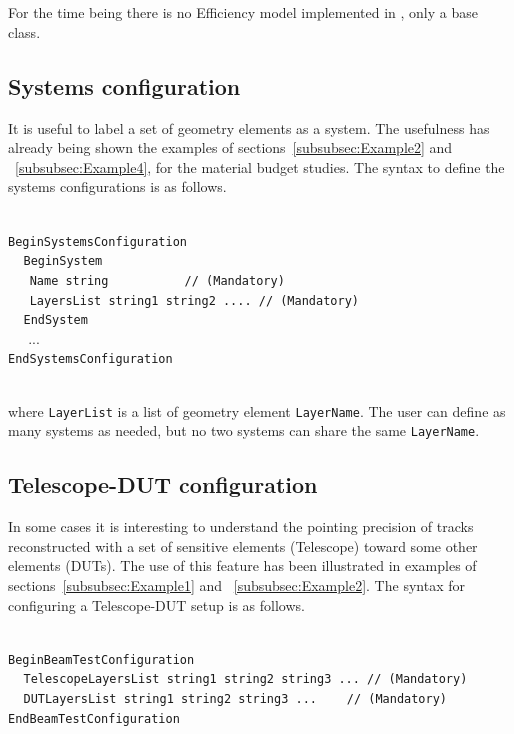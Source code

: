 ~\\
~\\
\noindent
For the time being there is no Efficiency model implemented in {\guari}, only a base class.

\subsection{Systems configuration}

It is useful to label a set of geometry elements as a system. The usefulness has already being shown the examples of 
sections~\ref{subsubsec:Example2} and ~\ref{subsubsec:Example4}, for the material budget studies. The syntax to define the 
systems configurations is as follows.

~\\
\noindent
{\tt BeginSystemsConfiguration} \\
$~~~~~${\tt BeginSystem} \\
$~~~~~~~${\tt Name             string       $~~~~~~~~~~~~~~~~~~~~$   // (Mandatory)} \\
$~~~~~~~${\tt LayersList       string1  string2  ....                // (Mandatory)} \\
$~~~~~${\tt EndSystem} \\
$~~~~~$ ... \\
{\tt EndSystemsConfiguration}

~\\
\noindent
where {\tt LayerList} is a list of geometry element {\tt LayerName}. The user can define as many systems as needed, but 
no two systems can share the same {\tt LayerName}.

\subsection{Telescope-DUT configuration}
\label{subsec::TelDUT_config}

In some cases it is interesting to understand the pointing precision of tracks reconstructed with a set of sensitive elements (Telescope) 
toward some other elements (DUTs). The use of this feature has been illustrated in examples of sections~\ref{subsubsec:Example1} and ~\ref{subsubsec:Example2}.
The syntax for configuring a Telescope-DUT setup is as follows.

~\\
\noindent
{\tt BeginBeamTestConfiguration} \\
$~~~~~${\tt TelescopeLayersList  string1   string2  string3  ... // (Mandatory)} \\
$~~~~~${\tt DUTLayersList        string1   string2  string3  ... $~~~~~$ // (Mandatory)} \\
{\tt EndBeamTestConfiguration}

